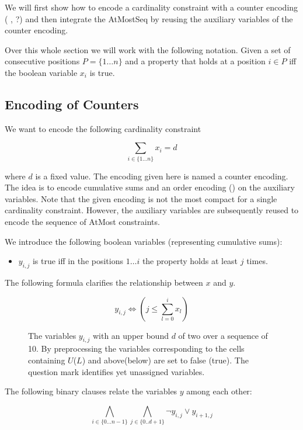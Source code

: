 \documentclass[]{llncs}
\newcommand{\TODO}[1]{ {\color{red}{#1} }}
\begin{document}
We will first show how to encode a cardinality constraint with a counter
encoding (\TODO{ref}, \cite{Een06} ?) and then integrate the AtMostSeq
by reusing the auxiliary variables of the counter encoding. 

Over this whole section we will work with the following notation. Given
a set of consecutive positions $P=\{1\ldots n\}$ and a property that
holds at a position $i\in P$ iff the boolean variable $x_i$ is true. 

\subsection{Encoding of Counters}

We want to encode the following cardinality constraint

$$ \sum_{i\in \{1\ldots n\}} x_{i} = d $$

where $d$ is a fixed value. The encoding given here is named a counter
encoding. The idea is to encode cumulative sums  and an order encoding (\cite{Tamura09}) on the auxiliary
variables. Note that the given encoding is not the most compact for a
single cardinality constraint.  However, the auxiliary variables are
subsequently reused to encode the sequence of AtMost constraints. 

We introduce the following boolean variables (representing cumulative sums): 

\begin{itemize}
    \item $y_{i,j}$ is true iff in the positions $1 \ldots i$ the
        property holds at least $j$ times.        
\end{itemize}

The following formula clarifies the relationship between $x$ and $y$.

$$ y_{i,j} \iff (j \leq \sum_{l=0}^{i} x_{l}) $$


\begin{figure}
\centering 
\caption{The variables $y_{i,j}$ with an upper bound $d$ of two over a
    sequence of 10. By preprocessing the variables corresponding to the
    cells containing $U$($L$) and above(below) are set to false (true).
The question mark identifies yet unassigned variables.}

\end{figure}

The following binary clauses relate the variables $y$ among
each other:

\begin{equation}
    \bigwedge_{i \in \{0\ldots n-1\}} \bigwedge_{j \in\{0..d+1\}}
    \neg y_{i,j} \vee y_{i+1,j}
\end{equation}
\end{document}
